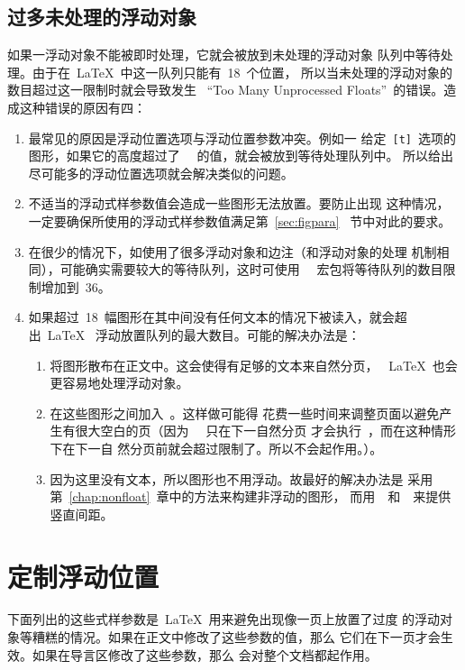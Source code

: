 \clearpage

\subsection{过多未处理的浮动对象}\label{ssec:toomanyfig}

如果一浮动对象不能被即时处理，它就会被放到未处理的浮动对象
队列中等待处理。由于在~\LaTeX{}~中这一队列只能有~18~个位置，
所以当未处理的浮动对象的数目超过这一限制时就会导致发生
~``Too Many Unprocessed Floats''~的错误。造成这种错误的原因有四：
\begin{enumerate}
	\item 最常见的原因是浮动位置选项与浮动位置参数冲突。例如一
	给定~\texttt{[t]}~选项的图形，如果它的高度超过了
	~~的值，就会被放到等待处理队列中。
	所以给出尽可能多的浮动位置选项就会解决类似的问题。
	\item 不适当的浮动式样参数值会造成一些图形无法放置。要防止出现
	这种情况，一定要确保所使用的浮动式样参数值满足第~\ref{sec:figpara}~
	节中对此的要求。
	\item 在很少的情况下，如使用了很多浮动对象和边注（和浮动对象的处理
	机制相同），可能确实需要较大的等待队列，这时可使用~~
	宏包将等待队列的数目限制增加到~36。
	\item 如果超过~18~幅图形在其中间没有任何文本的情况下被读入，就会超出~\LaTeX{}~
	浮动放置队列的最大数目。可能的解决办法是：
	\begin{enumerate}
		\item 将图形散布在正文中。这会使得有足够的文本来自然分页，
		~\LaTeX{}~也会更容易地处理浮动对象。
		\item 在这些图形之间加入~。这样做可能得
		花费一些时间来调整页面以避免产生有很大空白的页（因为
		~~只在下一自然分页
		才会执行~，而在这种情形下在下一自
		然分页前就会超过限制了。所以不会起作用。）。
		\item 因为这里没有文本，所以图形也不用浮动。故最好的解决办法是
		采用第~\ref{chap:nonfloat}~章中的方法来构建非浮动的图形，
		而用~~和~~来提供竖直间距。
	\end{enumerate}
\end{enumerate}

\section{定制浮动位置}\label{sec:typerule}

下面列出的这些式样参数是~\LaTeX{}~用来避免出现像一页上放置了过度
的浮动对象等糟糕的情况。如果在正文中修改了这些参数的值，那么
它们在下一页才会生效。如果在导言区修改了这些参数，那么
会对整个文档都起作用。

